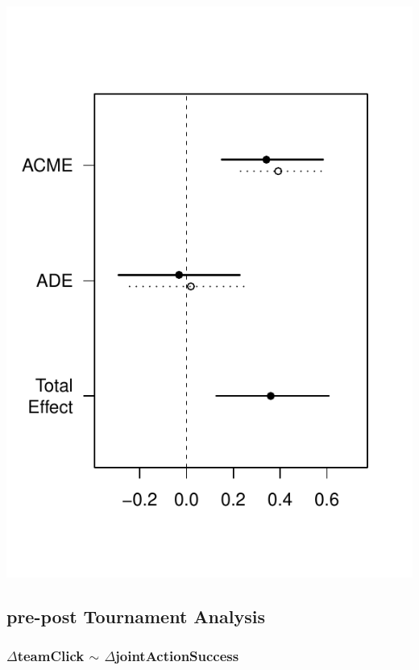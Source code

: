 \documentclass[12pt]{report}
\begin{document}
\includegraphics[width = \columnwidth]{../images/mediationPT_plot}













\subsection{pre-post Tournament Analysis}

\subsubsection{$\Delta$teamClick $\sim$ $\Delta$jointActionSuccess}

\newpage
\centering

\end{document}
